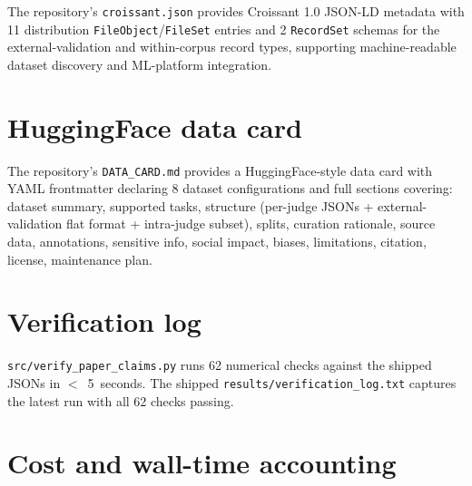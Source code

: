 \documentclass{article}
\begin{document}
The repository's \texttt{croissant.json} provides Croissant 1.0 JSON-LD metadata with 11 distribution \texttt{FileObject}/\texttt{FileSet} entries and 2 \texttt{RecordSet} schemas for the external-validation and within-corpus record types, supporting machine-readable dataset discovery and ML-platform integration.

\section{HuggingFace data card}\label{app:datacard}

The repository's \texttt{DATA\_CARD.md} provides a HuggingFace-style data card with YAML frontmatter declaring 8 dataset configurations and full sections covering: dataset summary, supported tasks, structure (per-judge JSONs + external-validation flat format + intra-judge subset), splits, curation rationale, source data, annotations, sensitive info, social impact, biases, limitations, citation, license, maintenance plan.

\section{Verification log}\label{app:verifier}

\texttt{src/verify\_paper\_claims.py} runs 62 numerical checks against the shipped JSONs in $<$~5~seconds. The shipped \texttt{results/verification\_log.txt} captures the latest run with all 62 checks passing.

\section{Cost and wall-time accounting}\label{app:cost}
\end{document}
